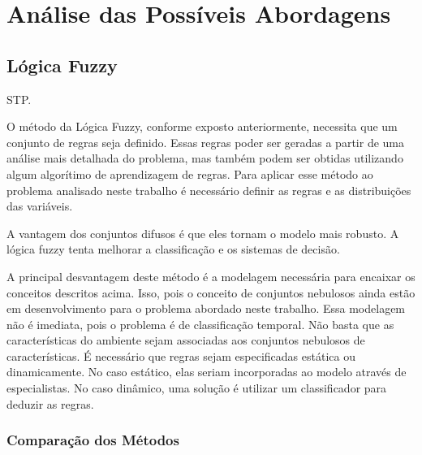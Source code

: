 \chapter{Análise das Possíveis Abordagens}\label{cap:anal_abordagens}



\section{Lógica Fuzzy}

STP.

O método da Lógica Fuzzy, conforme exposto anteriormente, necessita que um
conjunto de regras seja definido. Essas regras poder ser geradas a partir de uma
análise mais detalhada do problema, mas também podem ser obtidas utilizando
algum algorítimo de aprendizagem de regras. Para aplicar esse método ao problema
analisado neste trabalho é necessário definir as regras e as distribuições das
variáveis.

A vantagem dos conjuntos difusos é que eles tornam o modelo mais robusto. A
lógica fuzzy tenta melhorar a classificação e os sistemas de decisão.

A principal desvantagem deste método é a modelagem necessária para encaixar os
conceitos descritos acima. Isso, pois o conceito de conjuntos nebulosos ainda
estão em desenvolvimento para o problema abordado neste trabalho. Essa modelagem
não é imediata, pois o problema é de classificação temporal. Não basta que as
características do ambiente sejam associadas aos conjuntos nebulosos de
características. É necessário que regras sejam especificadas estática ou
dinamicamente. No caso estático, elas seriam incorporadas ao modelo através de
especialistas. No caso dinâmico, uma solução é utilizar um classificador para
deduzir as regras.

\subsection{Comparação dos Métodos}

